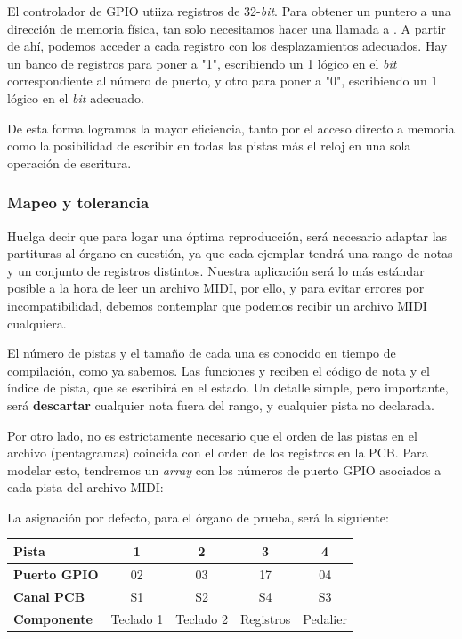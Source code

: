 \smallskip

El controlador de \acrshort{GPIO} utiiza registros de 32-\textit{bit}. Para obtener un puntero a una dirección de memoria física, tan solo necesitamos hacer una llamada a  \cite{soii}. A partir de ahí, podemos acceder a cada registro con los desplazamientos adecuados. Hay un banco de registros para poner a "1", escribiendo un 1 lógico en el \textit{bit} correspondiente al número de puerto, y otro para poner a "0", escribiendo un 1 lógico en el \textit{bit} adecuado.

De esta forma logramos la mayor eficiencia, tanto por el acceso directo a memoria como la posibilidad de escribir en todas las pistas más el reloj en una sola operación de escritura.

\subsubsection{Mapeo y tolerancia}

Huelga decir que para logar una óptima reproducción, será necesario adaptar las partituras al órgano en cuestión, ya que cada ejemplar tendrá una rango de notas y un conjunto de registros distintos. Nuestra aplicación será lo más estándar posible a la hora de leer un archivo \acrshort{MIDI}, por ello, y para evitar errores por incompatibilidad, debemos contemplar que podemos recibir un archivo \acrshort{MIDI} cualquiera.

El número de pistas y el tamaño de cada una es conocido en tiempo de compilación, como ya sabemos. Las funciones  y  reciben el código de nota y el índice de pista, que se escribirá en el estado. Un detalle simple, pero importante, será \textbf{descartar} cualquier nota fuera del rango, y cualquier pista no declarada.

Por otro lado, no es estrictamente necesario que el orden de las pistas en el archivo (pentagramas) coincida con el orden de los registros en la \acrshort{PCB}. Para modelar esto, tendremos un \textit{array} con los números de puerto \acrshort{GPIO} asociados a cada pista del archivo \acrshort{MIDI}:

La asignación por defecto, para el órgano de prueba, será la siguiente:



\smallskip

\begin{center}
	\begin{tabular}{|l|c|c|c|c|}
		\hline \textbf{Pista} & 1 & 2 & 3 & 4 \\
		\hline \textbf{Puerto GPIO} & 02 & 03 & 17 & 04 \\
		\hline \textbf{Canal PCB} & S1 & S2 & S4 & S3 \\
		\hline \textbf{Componente} & Teclado 1 & Teclado 2 & Registros & Pedalier \\
		\hline 
	\end{tabular}
	\smallskip
\end{center}

